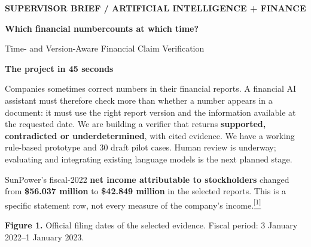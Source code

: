 \documentclass[10pt,a4paper]{article}
\newcommand{\sect}[1]{\par\vspace{5pt}{\large\bfseries\color{navy}#1}\par\vspace{1pt}}
\newcommand{\smallhead}[1]{{\bfseries\color{navy}#1}}
\newcommand{\citebrief}[1]{\hyperlink{ref#1}{\textsuperscript{[#1]}}}
\begin{document}
\color{ink}
{\scriptsize\bfseries\color{teal}SUPERVISOR BRIEF \quad / \quad ARTIFICIAL INTELLIGENCE + FINANCE}
\vspace{5pt}

{\fontsize{25}{28}\selectfont\bfseries\color{navy}Which financial number\newline counts at which time?}\par
{\large Time- and Version-Aware Financial Claim Verification}

\begin{tcolorbox}
\smallhead{The project in 45 seconds}\par
Companies sometimes correct numbers in their financial reports. A financial AI assistant must therefore check more than whether a number appears in a document: it must use the right report version and the information available at the requested date. We are building a verifier that returns \textbf{supported, contradicted or underdetermined}, with cited evidence. We have a working rule-based prototype and 30 draft pilot cases. Human review is underway; evaluating and integrating existing language models is the next planned stage.
\end{tcolorbox}

\sect{1. The problem, using one real company}
SunPower's fiscal-2022 \textbf{net income attributable to stockholders} changed from \textbf{\$56.037 million} to \textbf{\$42.849 million} in the selected reports. This is a specific statement row, not every measure of the company's income.\citebrief{1}

\begin{center}
\end{center}
\vspace{-7pt}
{\scriptsize\color{muted}\textbf{Figure 1.} Official filing dates of the selected evidence. Fiscal period: 3 January 2022--1 January 2023.}
\end{document}
